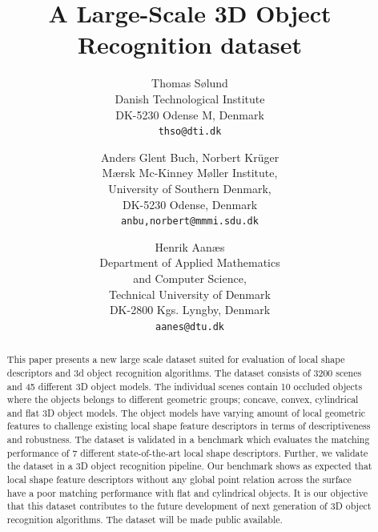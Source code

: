 \documentclass[10pt,twocolumn,letterpaper]{article}
\begin{document}
\title{A Large-Scale 3D Object Recognition dataset}

\author{Thomas S{\o}lund\\
Danish Technological Institute\\
DK-5230 Odense M, Denmark\\
{\tt\small thso@dti.dk}
\and
Anders Glent Buch, Norbert Kr\"u{}ger\\
M\ae{}rsk Mc-Kinney M\o{}ller Institute,\\
University of Southern Denmark,\\
DK-5230 Odense, Denmark \\
{\tt\small anbu,norbert@mmmi.sdu.dk}
\and
Henrik Aan\ae s\\ %
Department of Applied Mathematics\\ and Computer Science,\\ 
Technical University of Denmark\\
DK-2800 Kgs. Lyngby, Denmark\\
{\tt\small aanes@dtu.dk} %
}

\maketitle

\begin{abstract}
This paper presents a new large scale dataset suited for evaluation of local shape descriptors and 3d object recognition algorithms. The dataset consists of 3200 scenes and 45 different 3D object models. The individual scenes contain 10 occluded objects where the objects belongs to different geometric groups; concave, convex, cylindrical and flat 3D object models. The object models have varying amount of local geometric features to challenge existing local shape feature descriptors in terms of descriptiveness and robustness. The dataset is validated in a benchmark which evaluates the matching performance of 7 different state-of-the-art local shape descriptors. Further, we validate the dataset in a 3D object recognition pipeline. Our benchmark shows as expected that local shape feature descriptors without any global point relation across the surface have a poor matching performance with flat and cylindrical objects. It is our objective that this dataset contributes to the future development of next generation of 3D object recognition algorithms. The dataset will be made public available.
\end{abstract}
\end{document}
